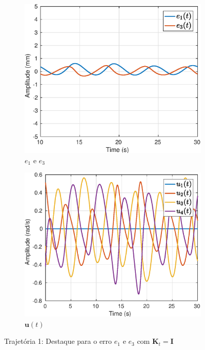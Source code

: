 \begin{figure}[H]
\centering
\begin{subfigure}{.5\textwidth}
  \centering
  \includegraphics[width=\linewidth]{./img/simul_delay_zoh1/error.eps}
  \caption{$e_1$ e $e_3$}
  \label{fig:sub1}
\end{subfigure}%
\begin{subfigure}{.5\textwidth}
  \centering
  \includegraphics[width=\linewidth]{./img/simul_delay_zoh1/u.eps}
  \caption{$\bm{u}(t)$}
  \label{fig:sub2}
\end{subfigure}
\caption{Trajetória 1: Destaque para o erro $e_1$ e $e_3$ com $\bm{K}_t = \bm{I}$}
\label{fig:erro_traj}
\end{figure}


